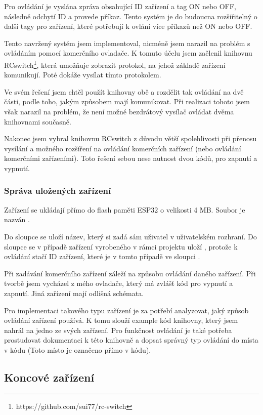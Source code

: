 \documentclass[11pt,a4paper,twoside,openright]{report}
\begin{document}
Pro ovládání  je vyslána zpráva obsahující ID zařízení a tag ON nebo OFF,  následně odchytí ID a provede příkaz. Tento systém je do budoucna rozšiřitelný o další tagy pro zařízení, které potřebují k ovlání více příkazů než ON nebo OFF.


Tento navržený systém jsem implementoval, nicméně jsem narazil na problém s ovládáním pomocí komerčního ovladače. K tomuto účelu jsem začlenil knihovnu RCswitch\footnote{https://github.com/sui77/rc-switch}, která umožňuje zobrazit protokol, na jehož základě zařízení komunikují. Poté dokáže vysílat tímto protokolem. 


Ve svém řešení jsem chtěl použít knihovny obě a rozdělit tak ovládání na dvě části, podle toho, jakým způsobem mají komunikovat. Při realizaci tohoto jsem však narazil na problém, že není možné bezdrátový vysílač ovládat dvěma knihovnami současně.


Nakonec jsem vybral knihovnu RCswitch z důvodu větší spolehlivosti při přenosu vysílání a možného rozšíření na ovládání komerčních zařízení (nebo ovládání komerčními zařízeními). Toto řešení sebou nese nutnost dvou kódů, pro zapnutí a vypnutí.


\subsubsection{Správa uložených zařízení}

Zařízení se ukládají přímo do flash paměti ESP32 o velikosti 4 MB. Soubor je nazván .


Do sloupce  se uloží název, který si zadá sám uživatel v uživatelském rozhraní. Do sloupce  se v případě zařízení vyrobeného v rámci projektu uloží , protože k ovládání stačí ID zařízení, které je v tomto případě ve sloupci .


Při zadávání komerčního zařízení záleží na způsobu ovládání daného zařízení. Při tvorbě jsem vycházel z mého ovladače, který má zvlášť kód pro vypnutí a zapnutí. Jiná zařízení mají odlišná schémata. 


Pro implementaci takového typu zařízení je za potřebí analyzovat, jaký způsob ovládání zařízení používá. K tomu slouží example kód knihovny, který jsem nahrál na jedno ze svých zařízení. Pro funkčnost ovládání je také potřeba prostudovat dokumentaci k této knihovně a dopsat správný typ ovládání do místa v kódu (Toto místo je označeno přímo v kódu).

\subsection{Koncové zařízení}
\end{document}

